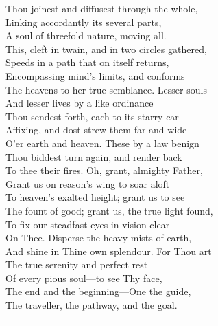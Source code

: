 \documentclass[12pt]{book}
\newenvironment{ipoem}[1]%
  {\setcounter{poemindentevery}{#1}\begin{poem}\small}%
  {\end{poem}\setcounter{poemindentevery}{0}}
\begin{document}
\begin{ipoem}{0}
    Thou joinest and diffusest through the whole, \\
    Linking accordantly its several parts, \\
    A soul of threefold nature, moving all. \\
    This, cleft in twain, and in two circles gathered, \\
    Speeds in a path that on itself returns, \\
    Encompassing mind's limits, and conforms \\
    The heavens to her true semblance. Lesser souls \\
    And lesser lives by a like ordinance \\
    Thou sendest forth, each to its starry car \\
    Affixing, and dost strew them far and wide \\
    O'er earth and heaven. These by a law benign \\
    Thou biddest turn again, and render back \\
    To thee their fires. Oh, grant, almighty Father, \\
    Grant us on reason's wing to soar aloft \\
    To heaven's exalted height; grant us to see \\
    The fount of good; grant us, the true light found, \\
    To fix our steadfast eyes in vision clear \\
    On Thee. Disperse the heavy mists of earth, \\
    And shine in Thine own splendour. For Thou art \\
    The true serenity and perfect rest \\
    Of every pious soul---to see Thy face, \\
    The end and the beginning---One the guide, \\
    The traveller, the pathway, and the goal. \\-
\end{ipoem}
\end{document}
